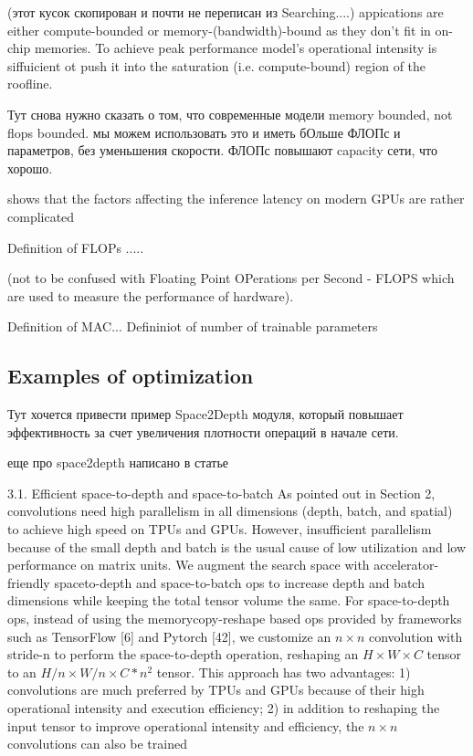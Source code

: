 (этот кусок скопирован и почти не переписан из Searching....) 
appications are either compute-bounded or memory-(bandwidth)-bound as they don't fit in on-chip memories. To achieve peak performance model's operational intensity is siffuicient ot push it into the saturation (i.e. compute-bound) region of the roofline.  

Тут снова нужно сказать о том, что современные модели memory bounded, not flops bounded. мы можем использовать это и иметь бОльше ФЛОПс и параметров, без уменьшения скорости. ФЛОПс повышают capacity сети, что хорошо. 


shows that the factors affecting the inference latency on modern GPUs are rather complicated



Definition of FLOPs .....

(not to be confused with Floating Point OPerations per Second - FLOPS which are used to measure the performance of hardware). 


Definition of MAC...
Defininiot of number of trainable parameters


\subsection{Examples of optimization}
Тут хочется привести пример Space2Depth модуля, который повышает эффективность за счет увеличения плотности операций в начале сети. 

еще про space2depth написано в статье \cite{ridnik2021_tresnet}


3.1. Efficient space-to-depth and space-to-batch
As pointed out in Section 2, convolutions need high parallelism in all dimensions (depth, batch, and spatial) to achieve high speed on TPUs and GPUs. However, insufficient parallelism because of the small depth and batch is the usual cause of low utilization and low performance on matrix units. We augment the search space with accelerator-friendly spaceto-depth and space-to-batch ops to increase depth and batch dimensions while keeping the total tensor volume the same. For space-to-depth ops, instead of using the memorycopy-reshape based ops provided by frameworks such as TensorFlow [6] and Pytorch [42], we customize an $n \times n$ convolution with stride-n to perform the space-to-depth operation, reshaping an $H \times W \times C$ tensor to an $H / n \times W / n \times C * n^{2}$ tensor. This approach has two advantages: 1) convolutions are much preferred by TPUs and GPUs because of their high operational intensity and execution efficiency; 2) in addition to reshaping the input tensor to improve operational intensity and efficiency, the $n \times n$ convolutions can also be trained

